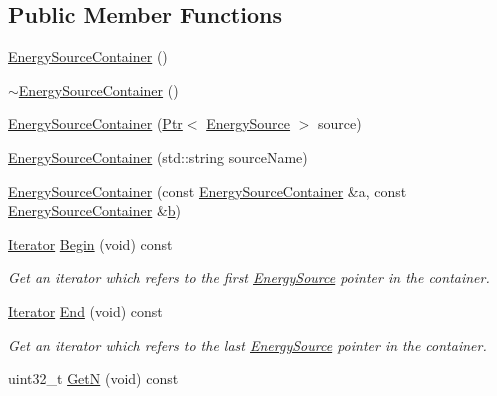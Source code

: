 \subsection*{Public Member Functions}
\begin{DoxyCompactItemize}
\item 
\hyperlink{classns3_1_1EnergySourceContainer_a3d96da242e1b8c5c24e6d42ae31e9193}{Energy\+Source\+Container} ()
\item 
\hyperlink{classns3_1_1EnergySourceContainer_a6befe871aeb75f37c8d5ade2dc341972}{$\sim$\+Energy\+Source\+Container} ()
\item 
\hyperlink{classns3_1_1EnergySourceContainer_af4d5bffbd0d2f57517b4501088104887}{Energy\+Source\+Container} (\hyperlink{classns3_1_1Ptr}{Ptr}$<$ \hyperlink{classns3_1_1EnergySource}{Energy\+Source} $>$ source)
\item 
\hyperlink{classns3_1_1EnergySourceContainer_a9bc152cfe4158173e7e84591ec2985dd}{Energy\+Source\+Container} (std\+::string source\+Name)
\item 
\hyperlink{classns3_1_1EnergySourceContainer_a330a725e90a489fb1339624754a8f4c3}{Energy\+Source\+Container} (const \hyperlink{classns3_1_1EnergySourceContainer}{Energy\+Source\+Container} \&a, const \hyperlink{classns3_1_1EnergySourceContainer}{Energy\+Source\+Container} \&\hyperlink{lte__pathloss_8m_a21ad0bd836b90d08f4cf640b4c298e7c}{b})
\item 
\hyperlink{classns3_1_1EnergySourceContainer_a4aef37787572d18785778ee20b003b2a}{Iterator} \hyperlink{classns3_1_1EnergySourceContainer_a0bf4b5518e6994180cee37859405696a}{Begin} (void) const 
\begin{DoxyCompactList}\small\item\em Get an iterator which refers to the first \hyperlink{classns3_1_1EnergySource}{Energy\+Source} pointer in the container. \end{DoxyCompactList}\item 
\hyperlink{classns3_1_1EnergySourceContainer_a4aef37787572d18785778ee20b003b2a}{Iterator} \hyperlink{classns3_1_1EnergySourceContainer_a7e45643bab98273a8f2c78c043b5ba3b}{End} (void) const 
\begin{DoxyCompactList}\small\item\em Get an iterator which refers to the last \hyperlink{classns3_1_1EnergySource}{Energy\+Source} pointer in the container. \end{DoxyCompactList}\item 
uint32\+\_\+t \hyperlink{classns3_1_1EnergySourceContainer_abf77e2a830c8679908dcfd813a756bee}{GetN} (void) const 

\end{DoxyCompactItemize}
